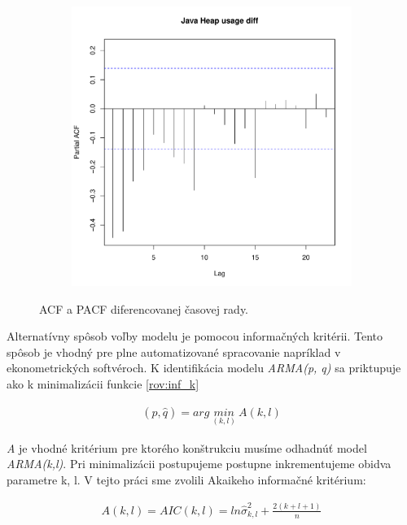 \documentclass[12pt,a4paper,oneside,final]{article}
\theoremstyle{definition}
\theoremstyle{remark}
\numberwithin{equation}{section}
\begin{document}
\begin{figure}[H]
\begin{subfigure}[b]{0.45\textwidth}
        \includegraphics[width=1\linewidth]{images/heap_diff_pacf.pdf}
    \end{subfigure}
    \caption{ACF a PACF diferencovanej časovej rady.}
    \label{obr:heap_diff_acf_pacf}
\end{figure}

Alternatívny spôsob voľby modelu je pomocou informačných kritérii. Tento spôsob je
vhodný pre plne automatizované spracovanie \cite{cipra} napríklad v ekonometrických 
softvéroch. K identifikácia modelu \emph{ARMA(p, q)} sa priktupuje ako k minimalizácii funkcie
\ref{rov:inf_k}

\begin{eqnarray} \label{rov:inf_k}
    (\hat{p}, \hat{q}) =arg\ \underset{(k,l)}{min}\ A(k, l)
\end{eqnarray}

\emph{A} je vhodné kritérium pre ktorého konštrukciu musíme odhadnúť model
\emph{ARMA(k,l)}. Pri minimalizácii postupujeme postupne inkrementujeme obidva parametre k, l.
V tejto práci sme zvolili Akaikeho informačné kritérium:

\begin{eqnarray} \label{rov:aic}
    A(k,l) = AIC(k,l) = ln\hat{\sigma}^{2}_{k,l} + \frac{2(k+l+1)}{n}
\end{eqnarray}
\end{document}
